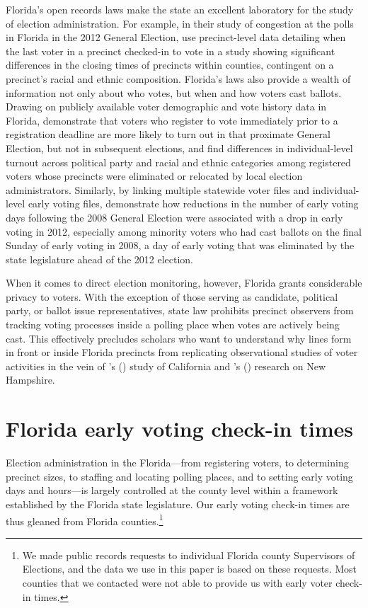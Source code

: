 \documentclass[12pt,titlepage]{article}
\newcommand{\possessivecite}[1]{\citeauthor{#1}'s (\citeyear{#1})}
\begin{document}
Florida's open records laws make the state an excellent laboratory for
the study of election administration. For example, in their study of
congestion at the polls in Florida in the 2012 General Election,
\cite{herronsmith:closingtimes} use precinct-level data detailing when
the last voter in a precinct checked-in to vote in a study showing
significant differences in the closing times of precincts within
counties, contingent on a precinct's racial and ethnic
composition. Florida's laws also provide a wealth of information not
only about who votes, but when and how voters cast ballots.  Drawing
on publicly available voter demographic and vote history data in
Florida, \cite{shinosmith:registrationtiming} demonstrate that voters
who register to vote immediately prior to a registration deadline are
more likely to turn out in that proximate General Election, but not in
subsequent elections, and \cite{amos_etal2017} find differences in
individual-level turnout across political party and racial and ethnic
categories among registered voters whose precincts were eliminated or
relocated by local election administrators.  Similarly, by linking
multiple statewide voter files and individual-level early voting
files, \cite{herron_smith2014} demonstrate how reductions in the
number of early voting days following the 2008 General Election were
associated with a drop in early voting in 2012, especially among
minority voters who had cast ballots on the final Sunday of early
voting in 2008, a day of early voting that was eliminated by the state
legislature ahead of the 2012 election.

When it comes to direct election monitoring, however, Florida grants
considerable privacy to voters.  With the exception of those serving
as candidate, political party, or ballot issue representatives, state
law prohibits precinct observers from tracking voting processes inside
a polling place when votes are actively being cast. This effectively
precludes scholars who want to understand why lines form in front or
inside Florida precincts from replicating observational studies of
voter activities in the vein of
\possessivecite{spencermarkovits:renege} study of California and
\possessivecite{herronsmith:hanoverstudy} research on New Hampshire.

\section*{Florida early voting check-in times}

Election administration in the Florida---from registering voters, to
determining precinct sizes, to staffing and locating polling places,
and to setting early voting days and hours---is largely controlled at
the county level within a framework established by the Florida state
legislature. Our early voting check-in times are thus gleaned from
Florida counties.\footnote{We made public records requests to
  individual Florida county Supervisors of Elections, and the data we
  use in this paper is based on these requests.  Most counties that we
  contacted were not able to provide us with early voter check-in
  times.}
\end{document}
